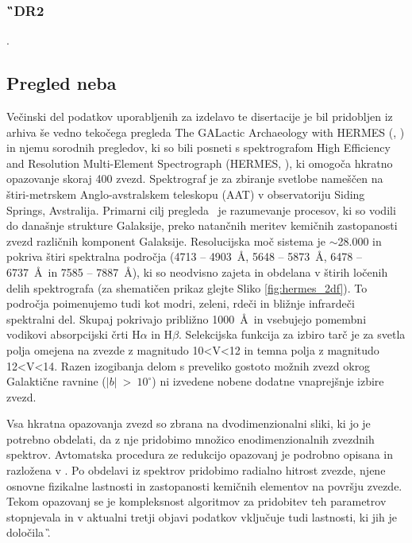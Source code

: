 \subsubsection{\G\ DR2}
.

\subsection{Pregled neba \Gh}
\label{sec:slo_galah}
Večinski del podatkov uporabljenih za izdelavo te disertacije je bil pridobljen iz arhiva še vedno tekočega pregleda The GALactic Archaeology with HERMES (\Gh, \cite{2015MNRAS.449.2604D}) in njemu sorodnih pregledov, ki so bili posneti s spektrografom High Efficiency and Resolution Multi-Element Spectrograph (HERMES, \cite{2010SPIE.7735E..09B, 2015JATIS...1c5002S}), ki omogoča hkratno opazovanje skoraj 400 zvezd. Spektrograf je za zbiranje svetlobe nameščen na štiri-metrskem Anglo-avstralskem teleskopu (AAT) v observatoriju Siding Springs, Avstralija. Primarni cilj pregleda \Gh\ je razumevanje procesov, ki so vodili do današnje strukture Galaksije, preko natančnih meritev kemičnih zastopanosti zvezd različnih komponent Galaksije. Resolucijska moč sistema je $\sim$28.000 in pokriva štiri spektralna področja (4713 -- 4903~\AA, 5648 -- 5873~\AA, 6478 -- 6737~\AA\ in 7585 -- 7887~\AA), ki so neodvisno zajeta in obdelana v štirih ločenih delih spektrografa (za shematičen prikaz glejte Sliko \ref{fig:hermes_2df}). To področja poimenujemo tudi kot modri, zeleni, rdeči in bližnje infrardeči spektralni del. Skupaj pokrivajo približno 1000~\AA\ in vsebujejo pomembni vodikovi absorpcijski črti H$\alpha$ in H$\beta$. Selekcijska funkcija za izbiro tarč je za svetla polja omejena na zvezde z magnitudo 10<V<12 in temna polja z magnitudo 12<V<14. Razen izogibanja delom s preveliko gostoto možnih zvezd okrog Galaktične ravnine ($|b|$~>~$10^\circ$) ni izvedene nobene dodatne vnaprejšnje izbire zvezd.

Vsa hkratna opazovanja zvezd so zbrana na dvodimenzionalni sliki, ki jo je potrebno obdelati, da z nje pridobimo množico enodimenzionalnih zvezdnih spektrov. Avtomatska procedura ze redukcijo opazovanj je podrobno opisana in razložena v \citet{2017MNRAS.464.1259K}. Po obdelavi iz spektrov pridobimo radialno hitrost zvezde, njene osnovne fizikalne lastnosti in zastopanosti kemičnih elementov na površju zvezde. Tekom opazovanj se je kompleksnost algoritmov za pridobitev teh parametrov stopnjevala in v aktualni tretji objavi podatkov vključuje tudi lastnosti, ki jih je določila \G. 


